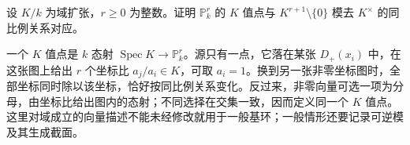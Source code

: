 \begin{optionalexercise}\label{b3:ex:24-field-valued-projective-points}
	设 \(K/k\) 为域扩张，\(r\ge0\) 为整数。证明 \(\mathbb P_k^r\) 的 \(K\) 值点与 \(K^{r+1}\setminus\{0\}\) 模去 \(K^\times\) 的同比例关系对应。
\end{optionalexercise}
\begin{solution}
	一个 \(K\) 值点是 \(k\) 态射 \(\operatorname{Spec}K\rightarrow\mathbb P_k^r\)。源只有一点，它落在某张 \(D_+(x_i)\) 中，在这张图上给出 \(r\) 个坐标比 \(a_j/a_i\in K\)，可取 \(a_i=1\)。换到另一张非零坐标图时，全部坐标同时除以该坐标，恰好按同比例关系变化。反过来，非零向量可选一项为分母，由坐标比给出图内的态射；不同选择在交集一致，因而定义同一个 \(K\) 值点。这里对域成立的向量描述不能未经修改就用于一般基环；一般情形还要记录可逆模及其生成截面。
\end{solution}
